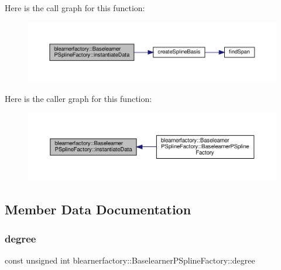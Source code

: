 Here is the call graph for this function\+:
\nopagebreak
\begin{figure}[H]
\begin{center}
\leavevmode
\includegraphics[width=350pt]{classblearnerfactory_1_1_baselearner_p_spline_factory_aeefb27ef79b2a95b2943a22d0e6368e2_cgraph}
\end{center}
\end{figure}
Here is the caller graph for this function\+:
\nopagebreak
\begin{figure}[H]
\begin{center}
\leavevmode
\includegraphics[width=350pt]{classblearnerfactory_1_1_baselearner_p_spline_factory_aeefb27ef79b2a95b2943a22d0e6368e2_icgraph}
\end{center}
\end{figure}


\subsection{Member Data Documentation}
\mbox{\label{classblearnerfactory_1_1_baselearner_p_spline_factory_aa245143409b64073ba36700c6868ece5}} 
\subsubsection{\texorpdfstring{degree}{degree}}
{\footnotesize\ttfamily const unsigned int blearnerfactory\+::\+Baselearner\+P\+Spline\+Factory\+::degree\hspace{0.3cm}{\ttfamily [private]}}



